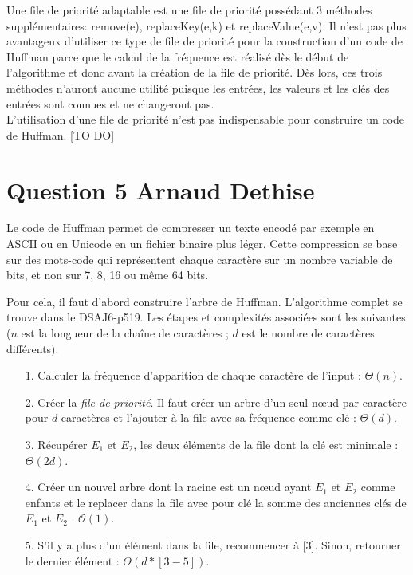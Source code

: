 \documentclass[10pt,a4paper]{article}
\begin{document}
Une file de priorité adaptable est une file de priorité possédant 3 méthodes supplémentaires: remove(e), replaceKey(e,k) et replaceValue(e,v). Il n'est pas plus avantageux d'utiliser ce type de file de priorité pour la construction d'un code de Huffman parce que le calcul de la fréquence est réalisé dès le début de l'algorithme et donc avant la création de la file de priorité. Dès lors, ces trois méthodes n'auront aucune utilité puisque les entrées, les valeurs et les clés des entrées sont connues et ne changeront pas.\\

L’utilisation d’une file de priorité n’est pas indispensable pour construire un code de Huffman. [TO DO]

\section*{Question 5 Arnaud Dethise}

	Le code de Huffman permet de compresser un texte encodé par exemple en ASCII ou en Unicode en un fichier binaire plus léger. Cette compression se base sur des mots-code qui représentent chaque caractère sur un nombre variable de bits, et non sur 7, 8, 16 ou même 64 bits.
	
	Pour cela, il faut d'abord construire l'arbre de Huffman. L'algorithme complet se trouve dans le DSAJ6-p519. Les étapes et complexités associées sont les suivantes ($n$ est la longueur de la chaîne de caractères ; $d$ est le nombre de caractères différents).
	\vspace{0.3cm}
	
	\begin{enumerate}
	\item[1.] Calculer la fréquence d'apparition de chaque caractère de l'input : $\Theta(n)$.
	\item[2.] Créer la \textit{file de priorité}. Il faut créer un arbre d'un seul nœud par caractère pour $d$ caractères et l'ajouter à la file avec sa fréquence comme clé : $\Theta(d)$.
	\item[3.] Récupérer $E_1$ et $E_2$, les deux éléments de la file dont la clé est minimale : $\Theta(2d)$.
	\item[4.] Créer un nouvel arbre dont la racine est un nœud ayant $E_1$ et $E_2$ comme enfants et le replacer dans la file avec pour clé la somme des anciennes clés de $E_1$ et $E_2$ : $\mathcal{O}(1)$.
	\item[5.] S'il y a plus d'un élément dans la file, recommencer à [3]. Sinon, retourner le dernier élément : $\Theta(d*[3-5])$.
	\end{enumerate}
	\vspace{0.3cm}
	
\end{document}
